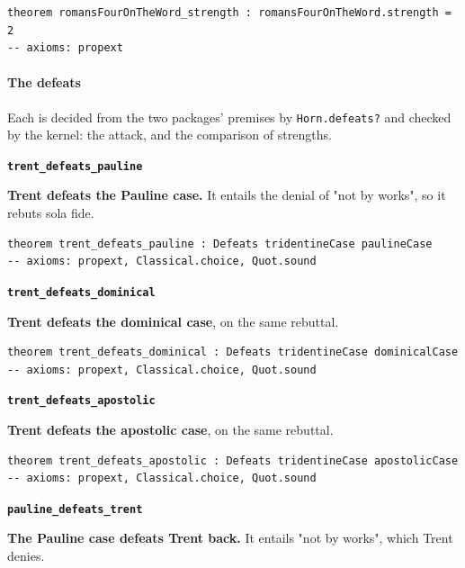 \documentclass[11pt]{article}
\begin{document}
{\small\begin{verbatim}
theorem romansFourOnTheWord_strength : romansFourOnTheWord.strength = 2
-- axioms: propext
\end{verbatim}}
\paragraph*{The defeats}
\leavevmode\par
Each is decided from the two packages' premises by \texttt{Horn.defeats?} and checked by the kernel: the attack, and the comparison of strengths.

\par\medskip\noindent\textbf{\texttt{trent\_\allowbreak{}defeats\_\allowbreak{}pauline}}\par\nobreak\noindent
\textbf{Trent defeats the Pauline case.} It entails the denial of "not by works", so it rebuts sola fide.

{\small\begin{verbatim}
theorem trent_defeats_pauline : Defeats tridentineCase paulineCase
-- axioms: propext, Classical.choice, Quot.sound
\end{verbatim}}
\par\medskip\noindent\textbf{\texttt{trent\_\allowbreak{}defeats\_\allowbreak{}dominical}}\par\nobreak\noindent
\textbf{Trent defeats the dominical case}, on the same rebuttal.

{\small\begin{verbatim}
theorem trent_defeats_dominical : Defeats tridentineCase dominicalCase
-- axioms: propext, Classical.choice, Quot.sound
\end{verbatim}}
\par\medskip\noindent\textbf{\texttt{trent\_\allowbreak{}defeats\_\allowbreak{}apostolic}}\par\nobreak\noindent
\textbf{Trent defeats the apostolic case}, on the same rebuttal.

{\small\begin{verbatim}
theorem trent_defeats_apostolic : Defeats tridentineCase apostolicCase
-- axioms: propext, Classical.choice, Quot.sound
\end{verbatim}}
\par\medskip\noindent\textbf{\texttt{pauline\_\allowbreak{}defeats\_\allowbreak{}trent}}\par\nobreak\noindent
\textbf{The Pauline case defeats Trent back.} It entails "not by works", which Trent denies.
\end{document}
